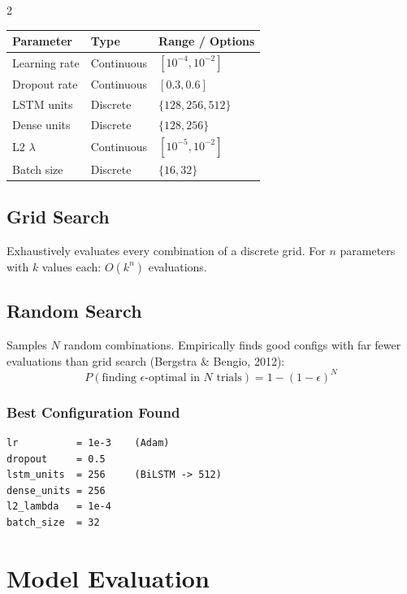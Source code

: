 \documentclass[10pt, a4paper]{article}
\begin{document}
\begin{multicols}{2}
\begin{center}
\scriptsize
\begin{tabular}{@{}p{1.9cm} p{1.3cm} p{2.3cm}@{}}
\toprule
\textbf{Parameter} & \textbf{Type} & \textbf{Range / Options} \\
\midrule
Learning rate   & Continuous & $[10^{-4}, 10^{-2}]$ \\
Dropout rate    & Continuous & $[0.3, 0.6]$ \\
LSTM units      & Discrete   & $\{128, 256, 512\}$ \\
Dense units     & Discrete   & $\{128, 256\}$ \\
L2 $\lambda$    & Continuous & $[10^{-5}, 10^{-2}]$ \\
Batch size      & Discrete   & $\{16, 32\}$ \\
\bottomrule
\end{tabular}
\end{center}

\subsection{Grid Search}
Exhaustively evaluates every combination of a discrete grid.
For $n$ parameters with $k$ values each: $O(k^n)$ evaluations.

\subsection{Random Search}
Samples $N$ random combinations. Empirically finds good configs
with far fewer evaluations than grid search (Bergstra \& Bengio, 2012):
\begin{equation}
P(\text{finding } \epsilon\text{-optimal in }N\text{ trials})
= 1 - (1 - \epsilon)^N
\end{equation}

\subsubsection{Best Configuration Found}
\begin{codebox}
\footnotesize
\begin{verbatim}
lr          = 1e-3    (Adam)
dropout     = 0.5
lstm_units  = 256     (BiLSTM -> 512)
dense_units = 256
l2_lambda   = 1e-4
batch_size  = 32
\end{verbatim}
\end{codebox}

\section{Model Evaluation}


\end{multicols}
\end{document}
